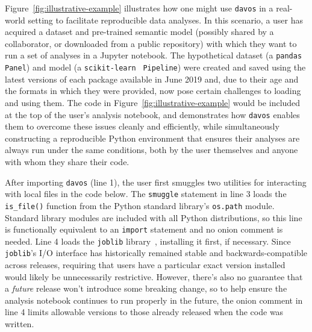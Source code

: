 \documentclass[preprint,12pt,a4paper]{elsarticle}
\begin{document}
Figure~\ref{fig:illustrative-example} illustrates how one might use \texttt{davos} in a real-world setting to facilitate reproducible data analyses. In this scenario, a user has acquired a dataset and pre-trained semantic model (possibly shared by a collaborator, or downloaded from a public repository) with which they want to run a set of analyses in a Jupyter notebook. The hypothetical dataset (a \texttt{pandas}~\cite{McKi10} \texttt{Panel}) and model (a \texttt{scikit-learn}~\cite{PedrEtal11} \texttt{Pipeline}) were created and saved using the latest versions of each package available in June 2019 and, due to their age and the formats in which they were provided, now pose certain challenges to loading and using them. The code in Figure~\ref{fig:illustrative-example} would be included at the top of the user's analysis notebook, and demonstrates how \texttt{davos} enables them to overcome these issues cleanly and efficiently, while simultaneously constructing a reproducible Python environment that ensures their analyses are always run under the same conditions, both by the user themselves and anyone with whom they share their code.

After importing \texttt{davos} (line 1), the user first smuggles two utilities for interacting with local files in the code below. The \texttt{smuggle} statement in line 3 loads the \texttt{is\_file()} function from the Python standard library's \texttt{os.path} module. Standard library modules are included with all Python distributions, so this line is functionally equivalent to an \texttt{import} statement and no onion comment is needed. Line 4 loads the \texttt{joblib} library~\cite{Varo10}, installing it first, if necessary. Since \texttt{joblib}'s I/O interface has historically remained stable and backwards-compatible across releases, requiring that users have a particular exact version installed would likely be unnecessarily restrictive. However, there's also no guarantee that a \textit{future} release won't introduce some breaking change, so to help ensure the analysis notebook continues to run properly in the future, the onion comment in line 4 limits allowable versions to those already released when the code was written.
\end{document}
